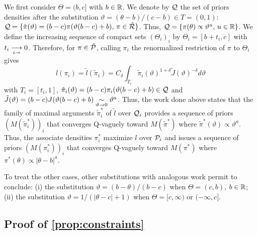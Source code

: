 We first consider $\Theta=(b,c]$ with $b\in\mathbb{R}$.
We denote by $\mathcal{Q}$ the set of priors densities after the substitution $\vartheta = (\theta-b)/(c-b)\in T=(0,1)$:  $\mathcal{Q}=\{\tilde\pi(\vartheta) = (b-c)\pi(\vartheta (b-c)+b),\,\pi\in\hat{\mathcal{R}}\}$.
Thus, $\mathcal{Q} = \{\pi(\theta)\propto\vartheta^u,\,u\in\mathbb{R}\}$.
We define the increasing sequence of compact sets $(\Theta_i)_i$ by $\Theta_i = [b+t_i,c]$ with $t_i\overset{\ }{\underset{i\rightarrow}{\longrightarrow}}0$. Therefore, for $\pi\in\hat{\mathcal{P}}$, calling $\pi_i$ the renormalized restriction of $\pi$ to $\Theta_i$ gives
    \begin{equation}
        l(\pi_i) = \tilde l(\tilde\pi_i) = C_\delta\int_{T_i}\tilde\pi_i(\vartheta)^{1+\delta}\tilde J(\vartheta)^{-\delta}d\vartheta
    \end{equation}
with $T_i=[t_i,1]$, $\tilde\pi_i(\vartheta) = (b-c)\pi_i(\vartheta (b-c)+b)\in\mathcal{Q}$ and $\tilde J(\vartheta) = (b-c)J(\vartheta (b-c)+b)\underset{\vartheta\rightarrow0}{\sim}\vartheta^a$.
Thus, the work done above states that the family of maximal arguments $\tilde\pi_i^\ast$ of $\tilde l$ over $\mathcal{Q}_i$  provides a sequence of priors $(M(\tilde\pi_i^\ast))_i$ that converges Q-vaguely toward $M(\tilde\pi^\ast)$ where $\tilde\pi^\ast(\vartheta)\propto\vartheta^a$.
Thus, the associate densities $\pi^\ast_i$ maximize $l$ over $\mathcal{P}_i$ and issues a sequence of priors $(M(\pi^\ast_i))_i$ that converges Q-vaguely toward $M(\pi^\ast)$ where $\pi^\ast(\theta)\propto|\theta-b|^a$.

To treat the other cases, other substitutions with analogous work permit to conclude:
(i) the substitution $\vartheta=(b-\theta)/(b-c)$
when $\Theta=(c,b)$, $b\in\mathbb{R}$; (ii) the substitution $\vartheta=1/(|\theta-c|+1)$ when 
$\Theta=[c,\infty)$ or $(-\infty,c]$.








\subsection{Proof of \cref{prop:constraints}}

